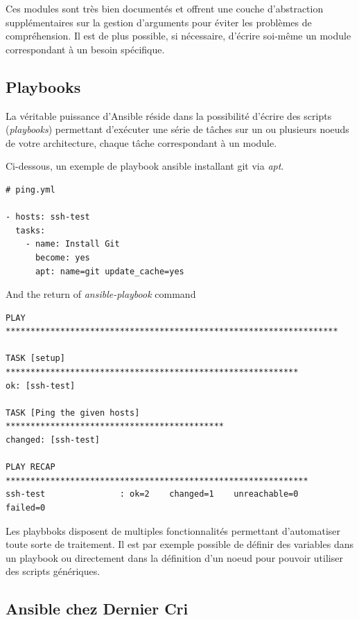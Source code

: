 \bigskip

Ces modules sont très bien documentés et offrent une couche
d'abstraction supplémentaires sur la gestion d'arguments pour éviter les
problèmes de compréhension. Il est de plus possible, si nécessaire,
d'écrire soi-même un module correspondant à un besoin spécifique.

\newpage

\subsection{Playbooks}\label{playbooks}

La véritable puissance d'Ansible réside dans la possibilité d'écrire des
scripts (\emph{playbooks}) permettant d'exécuter une série de tâches sur
un ou plusieurs noeuds de votre architecture, chaque tâche correspondant
à un module.

\bigskip

Ci-dessous, un exemple de playbook ansible installant git via
\emph{apt}.

\begin{verbatim}
# ping.yml

- hosts: ssh-test
  tasks:
    - name: Install Git
      become: yes
      apt: name=git update_cache=yes
\end{verbatim}

And the return of \emph{ansible-playbook} command

\begin{verbatim}
PLAY *******************************************************************

TASK [setup] ***********************************************************
ok: [ssh-test]

TASK [Ping the given hosts] ********************************************
changed: [ssh-test]

PLAY RECAP *************************************************************
ssh-test               : ok=2    changed=1    unreachable=0    failed=0   
\end{verbatim}

\bigskip

Les playbboks disposent de multiples fonctionnalités permettant
d'automatiser toute sorte de traitement. Il est par exemple possible de
définir des variables dans un playbook ou directement dans la définition
d'un noeud pour pouvoir utiliser des scripts génériques.

\newpage

\subsection{Ansible chez Dernier Cri}\label{ansible-chez-dernier-cri}

